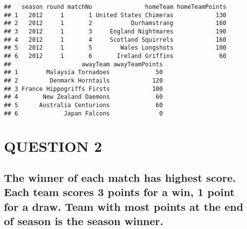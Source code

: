 \documentclass[
]{article}
\begin{document}
\begin{verbatim}
##   season round matchNo               homeTeam homeTeamPoints
## 1   2012     1       1 United States Chimeras            130
## 2   2012     1       2           Durhamstrang            160
## 3   2012     1       3     England Nightmares            190
## 4   2012     1       4     Scotland Squirrels            160
## 5   2012     1       5        Wales Longshots            100
## 6   2012     1       6       Ireland Griffins             60
##                    awayTeam awayTeamPoints
## 1        Malaysia Tornadoes             50
## 2         Denmark Horntails            120
## 3 France Hippogriffs Firsts            100
## 4       New Zealand Daemons             60
## 5      Australia Centurions             60
## 6             Japan Falcons              0
\end{verbatim}

\hypertarget{question-2}{%
\section{QUESTION 2}\label{question-2}}

\hypertarget{the-winner-of-each-match-has-highest-score.-each-team-scores-3-points-for-a-win-1-point-for-a-draw.-team-with-most-points-at-the-end-of-season-is-the-season-winner.}{%
\subsection{The winner of each match has highest score. Each team scores
3 points for a win, 1 point for a draw. Team with most points at the end
of season is the season
winner.}\label{the-winner-of-each-match-has-highest-score.-each-team-scores-3-points-for-a-win-1-point-for-a-draw.-team-with-most-points-at-the-end-of-season-is-the-season-winner.}}
\end{document}
